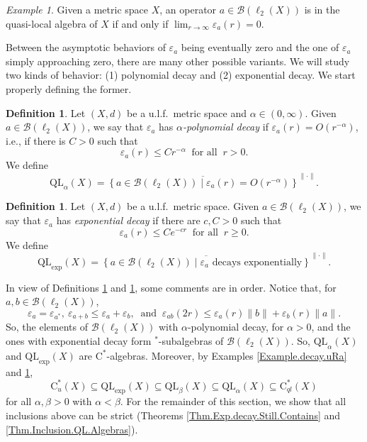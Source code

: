 \documentclass[11pt]{amsart}
\newcommand{\cB}{\mathcal{B}}
\newcommand{\eps}{\varepsilon}
\newcommand{\cstu}{\mathrm{C}^*_u}
\newcommand{\cstql}{\mathrm{C}^*_{\textit{ql}}}
\newcommand{\cstar}{$\mathrm{C}^*$}
\numberwithin{equation}{section}
\theoremstyle{definition}
\newtheorem{definition}[theorem]{Definition}
\theoremstyle{remark}
\newtheorem{example}[theorem]{Example}
\begin{document}
\begin{example}\label{Example.decay.ql}
    Given a metric space $X$, an operator $a\in \cB(\ell_2(X))$ is in the quasi-local algebra of $X$  if and only if $\lim_{r\to \infty}\eps_a(r)=0$.
\end{example}

Between the asymptotic behaviors of $\eps_a$ being eventually zero and the one of $\eps_a$ simply approaching zero, there are many other possible variants. We will study two kinds of behavior: (1) polynomial decay and (2) exponential decay. We start properly defining the former.

\begin{definition}\label{Defi.QLalpha}
    Let $(X,d)$ be a u.l.f.\ metric space and $\alpha\in (0,\infty)$.
    Given $a\in\cB(\ell_2(X))$, we say that $\eps_a$ has \emph{$\alpha$-polynomial decay} if $\eps_a(r)=O(r^{-\alpha})$, i.e., if there is $C>0$ such that \[\eps_a(r)\leq Cr^{-\alpha}\ \text{  for all }\ r>0.\] We define
    \[\mathrm{QL}_{\alpha}(X)=\overline{\left\{a\in \cB(\ell_2(X))\mid \eps_a(r)= O(r^{-\alpha})\right\}}^{\|\cdot\|}.\]
    \end{definition}

\begin{definition}\label{Defi.QL.exp}
    Let $(X,d)$ be a u.l.f.\ metric space.
 Given $a\in\cB(\ell_2(X))$, we say that $\eps_a$ has \emph{exponential decay} if  there are $c,C>0$ such that
    \[\eps_a(r)\leq Ce^{-cr}\ \text{ for all }\ r\geq 0.\] We define
    \[\mathrm{QL}_{\exp}(X)=\overline{\left\{a\in \cB(\ell_2(X))\mid \eps_a\text{ decays exponentially}\right\}}^{\|\cdot\|}.\]
\end{definition}

In  view of Definitions \ref{Defi.QLalpha} and \ref{Defi.QL.exp}, some comments are in order.
Notice that, for $a,b\in \cB(\ell_2(X))$,  \[\eps_a=\eps_{a^*},\ \eps_{a+b}\leq \eps_a+\eps_b,\ \text{ and }\ \eps_{ab}(2r)\leq \eps_{a}(r)\|b\|+\eps_b(r)\|a\|.\] So, the elements of $\cB(\ell_2(X))$ with $\alpha$-polynomial decay, for  $\alpha>0$, and the ones with exponential decay form  $^*$-subalgebras of $\cB(\ell_2(X))$. So, $\mathrm{QL}_\alpha(X)$ and   $\mathrm{QL}_{\exp}(X)$ are \cstar-algebras. Moreover, by Examples \ref{Example.decay.uRa} and \ref{Example.decay.ql},
\[\cstu(X)\subseteq \mathrm{QL}_{\exp}(X) \subseteq \mathrm{QL}_{\beta}(X)\subseteq \mathrm{QL}_\alpha(X)\subseteq\cstql(X)\]
for all  $\alpha,\beta>0$ with  $\alpha<\beta$. For the remainder of this section, we show that  all inclusions above can be strict  (Theorems \ref{Thm.Exp.decay.Still.Contains} and \ref{Thm.Inclusion.QL.Algebras}).
\end{document}
